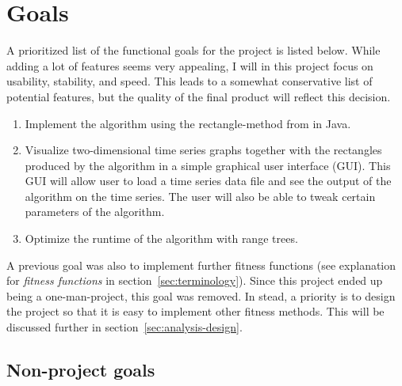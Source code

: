 
\clearpage
\section{Goals} \label{sec:goals}

A prioritized list of the functional goals for the project is listed below.
While adding a lot of features seems very appealing, I will in this project
focus on usability, stability, and speed. This leads to a somewhat conservative
list of potential features, but the quality of the final product will reflect
this decision. 

\begin{enumerate}
    \item Implement the algorithm using the rectangle-method from
    \cite{doerr2017a} in Java. 
    
    \item Visualize two-dimensional time series graphs together with the
    rectangles produced by the algorithm in a simple graphical user interface
    (GUI). This GUI will allow user to load a time series data file and see the
    output of the algorithm on the time series. The user will also be able to
    tweak certain parameters of the algorithm. 
    
    \item Optimize the runtime of the algorithm with range trees. 
\end{enumerate}

A previous goal was also to implement further fitness functions (see explanation
for \textit{fitness functions} in section~\ref{sec:terminology}). Since this
project ended up being a one-man-project, this goal was removed. In stead, a
priority is to design the project so that it is easy to implement other fitness
methods. This will be discussed further in section~\ref{sec:analysis-design}.


\subsection{Non-project goals} 

